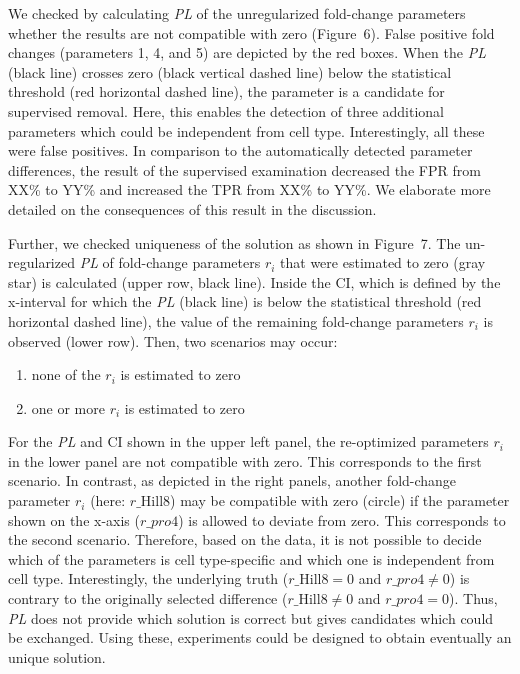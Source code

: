 \documentclass{bioinfo}
\begin{document}
We checked by calculating \emph{PL} of the unregularized fold-change parameters whether the results are not compatible with zero (Figure~6\vphantom{\ref{fig:06}}).
False positive fold changes (parameters 1, 4, and 5) are depicted by the red boxes.
When the \emph{PL} (black line) crosses zero (black vertical dashed line) below the statistical threshold (red horizontal dashed line), the parameter is a candidate for supervised removal.
Here, this enables the detection of three additional parameters which could be independent from cell type.
Interestingly, all these were false positives.
In comparison to the automatically detected parameter differences, the result of the supervised examination decreased the FPR from XX\% to YY\% and increased the TPR from XX\% to YY\%.
We elaborate more detailed on the consequences of this result in the discussion.

Further, we checked uniqueness of the solution as shown in Figure~7\vphantom{\ref{fig:07}}.
The un-regularized \emph{PL} of fold-change parameters $r_i$ that were estimated to zero (gray star) is calculated (upper row, black line).
Inside the CI, which is defined by the x-interval for which the \emph{PL} (black line) is below the statistical threshold (red horizontal dashed line), the value of the remaining fold-change parameters $r_i$ is observed (lower row).
Then, two scenarios may occur:
\begin{enumerate}
\item none of the $r_i$ is estimated to zero
\item one or more $r_i$ is estimated to zero
\end{enumerate}
For the \emph{PL} and CI shown in the upper left panel, the re-optimized parameters $r_i$ in the lower panel are not compatible with zero.
This corresponds to the first scenario.
In contrast, as depicted in the right panels, another fold-change parameter $r_i$ (here: $r\_\text{Hill}8$) may be compatible with zero (circle) if the parameter shown on the x-axis ($r\_{pro4}$) is allowed to deviate from zero.
This corresponds to the second scenario.
Therefore, based on the data, it is not possible to decide which of the parameters is cell type-specific and which one is independent from cell type.
Interestingly, the underlying truth ($r\_\text{Hill}8=0$ and $r\_{pro4}\neq0$) is contrary to the originally selected difference ($r\_\text{Hill}8\neq0$ and $r\_{pro4}=0$).
Thus, \emph{PL} does not provide which solution is correct but gives candidates which could be exchanged.
Using these, experiments could be designed to obtain eventually an unique solution.
\end{document}
